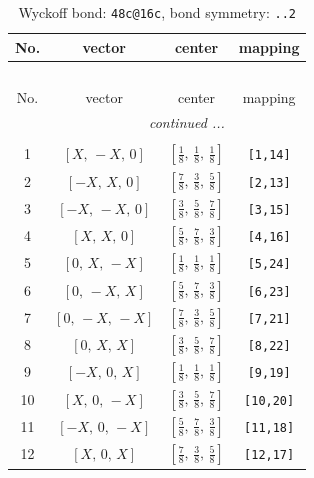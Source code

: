 \documentclass[fleqn,8pt]{jsarticle}
\begin{document}
\renewcommand{\arraystretch}{1.2}
\begin{longtable}{cccc}
\caption{Wyckoff bond: {\tt 48c@16c}, bond symmetry: {\tt ..2}}
 \\
 \hline \hline
No. & vector & center & mapping \\ \hline \endfirsthead

\multicolumn{3}{l}{\tablename\ \thetable{}} \\
 \hline \hline
No. & vector & center & mapping \\ \hline \endhead

 \hline \hline
\multicolumn{3}{r}{\footnotesize\it continued ...} \\ \endfoot

 \hline \hline
\multicolumn{3}{r}{} \\ \endlastfoot

1 & $\left[ X,\, - X,\, 0 \right]$ & $\left[ \frac{1}{8},\, \frac{1}{8},\, \frac{1}{8} \right]$ & {\tt [1,14]} \\ \hline
2 & $\left[ - X,\, X,\, 0 \right]$ & $\left[ \frac{7}{8},\, \frac{3}{8},\, \frac{5}{8} \right]$ & {\tt [2,13]} \\ \hline
3 & $\left[ - X,\, - X,\, 0 \right]$ & $\left[ \frac{3}{8},\, \frac{5}{8},\, \frac{7}{8} \right]$ & {\tt [3,15]} \\ \hline
4 & $\left[ X,\, X,\, 0 \right]$ & $\left[ \frac{5}{8},\, \frac{7}{8},\, \frac{3}{8} \right]$ & {\tt [4,16]} \\ \hline
5 & $\left[ 0,\, X,\, - X \right]$ & $\left[ \frac{1}{8},\, \frac{1}{8},\, \frac{1}{8} \right]$ & {\tt [5,24]} \\ \hline
6 & $\left[ 0,\, - X,\, X \right]$ & $\left[ \frac{5}{8},\, \frac{7}{8},\, \frac{3}{8} \right]$ & {\tt [6,23]} \\ \hline
7 & $\left[ 0,\, - X,\, - X \right]$ & $\left[ \frac{7}{8},\, \frac{3}{8},\, \frac{5}{8} \right]$ & {\tt [7,21]} \\ \hline
8 & $\left[ 0,\, X,\, X \right]$ & $\left[ \frac{3}{8},\, \frac{5}{8},\, \frac{7}{8} \right]$ & {\tt [8,22]} \\ \hline
9 & $\left[ - X,\, 0,\, X \right]$ & $\left[ \frac{1}{8},\, \frac{1}{8},\, \frac{1}{8} \right]$ & {\tt [9,19]} \\ \hline
10 & $\left[ X,\, 0,\, - X \right]$ & $\left[ \frac{3}{8},\, \frac{5}{8},\, \frac{7}{8} \right]$ & {\tt [10,20]} \\ \hline
11 & $\left[ - X,\, 0,\, - X \right]$ & $\left[ \frac{5}{8},\, \frac{7}{8},\, \frac{3}{8} \right]$ & {\tt [11,18]} \\ \hline
12 & $\left[ X,\, 0,\, X \right]$ & $\left[ \frac{7}{8},\, \frac{3}{8},\, \frac{5}{8} \right]$ & {\tt [12,17]} \\
\end{longtable}
\end{document}
